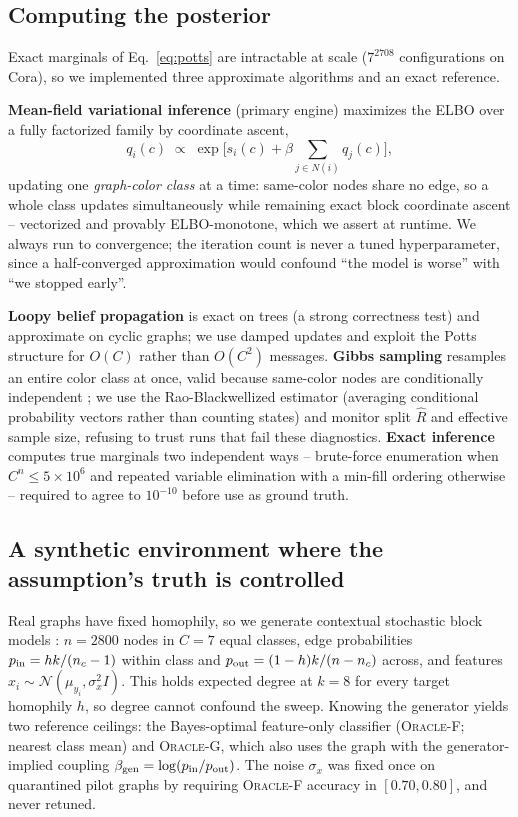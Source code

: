 \documentclass{article}
\begin{document}
\subsection{Computing the posterior}

Exact marginals of Eq.~\ref{eq:potts} are intractable at scale ($7^{2708}$ configurations on
Cora), so we implemented three approximate algorithms and an exact reference.

\textbf{Mean-field variational inference} (primary engine) maximizes the ELBO over a fully
factorized family by coordinate ascent,
\begin{equation}
q_i(c)\;\propto\;\exp\Big[s_i(c)+\beta\textstyle\sum_{j\in N(i)}q_j(c)\Big],
\label{eq:mf}
\end{equation}
updating one \emph{graph-color class} at a time: same-color nodes share no edge, so a whole
class updates simultaneously while remaining exact block coordinate ascent -- vectorized and
provably ELBO-monotone, which we assert at runtime. We always run to convergence; the iteration
count is never a tuned hyperparameter, since a half-converged approximation would confound
``the model is worse'' with ``we stopped early''.

\textbf{Loopy belief propagation} is exact on trees (a strong correctness test) and approximate
on cyclic graphs; we use damped updates and exploit the Potts structure for $O(C)$ rather than
$O(C^2)$ messages. \textbf{Gibbs sampling} resamples an entire color class at once, valid
because same-color nodes are conditionally independent \citep{gonzalez2011parallel}; we use the
Rao-Blackwellized estimator (averaging conditional probability vectors rather than counting
states) and monitor split $\hat{R}$ and effective sample size, refusing to trust runs that fail
these diagnostics. \textbf{Exact inference} computes true marginals two independent ways --
brute-force enumeration when $C^n\le 5{\times}10^6$ and repeated variable elimination with a
min-fill ordering otherwise -- required to agree to $10^{-10}$ before use as ground truth.

\subsection{A synthetic environment where the assumption's truth is controlled}

Real graphs have fixed homophily, so we generate contextual stochastic block models
\citep{deshpande2018contextual}: $n=2800$ nodes in $C=7$ equal classes, edge probabilities
$p_{\rm in}=hk/(n_c-1)$ within class and $p_{\rm out}=(1-h)k/(n-n_c)$ across, and features
$x_i\sim\mathcal{N}(\mu_{y_i},\sigma_x^2 I)$. This holds expected degree at $k=8$ for every
target homophily $h$, so degree cannot confound the sweep. Knowing the generator yields two
reference ceilings: the Bayes-optimal feature-only classifier (\textsc{Oracle-F}; nearest class
mean) and \textsc{Oracle-G}, which also uses the graph with the generator-implied coupling
$\beta_{\rm gen}=\log(p_{\rm in}/p_{\rm out})$. The noise $\sigma_x$ was fixed once on
quarantined pilot graphs by requiring \textsc{Oracle-F} accuracy in $[0.70,0.80]$, and never
retuned.
\end{document}
